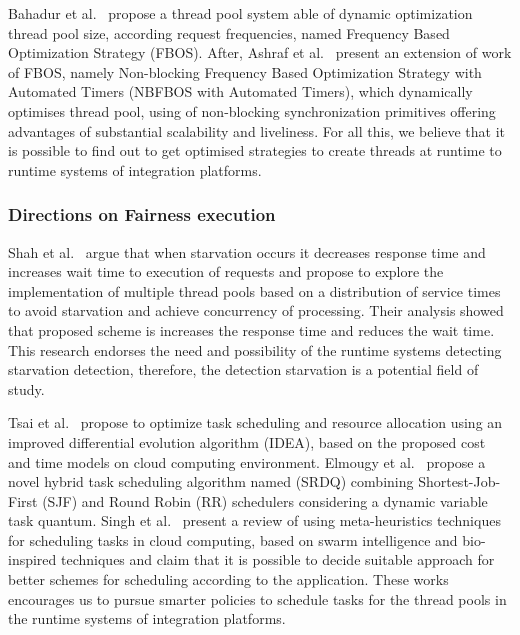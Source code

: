 Bahadur et al.~\cite{bahadur2014} propose a thread pool system able of dynamic optimization thread pool size, according request frequencies, named Frequency Based Optimization Strategy (FBOS). After, Ashraf et al.~\cite{ashraf2016} present an extension of work of FBOS, namely Non-blocking Frequency Based Optimization Strategy with Automated Timers (NBFBOS with Automated Timers), which dynamically optimises thread pool, using of non-blocking synchronization primitives offering advantages of substantial scalability and liveliness. For all this, we believe that it is possible to find out to get optimised strategies to create threads at runtime to runtime systems of integration platforms.

\subsubsection{{Directions on Fairness execution}}
\label{subsubsec:directions_fairness}
Shah et al.~\cite{shah2017} argue that when starvation occurs it decreases response time and increases wait time to execution of requests and propose to explore the implementation of multiple thread pools based on a distribution of service times to avoid starvation and achieve concurrency of processing. Their analysis showed that proposed scheme is increases the response time and reduces the wait time. This research endorses the need and possibility of the runtime systems detecting starvation detection, therefore, the detection starvation is a potential field of study.

Tsai et al.~\cite{tsai2013} propose to optimize task scheduling and resource allocation using an improved differential evolution algorithm (IDEA), based on the proposed cost and time models on cloud computing environment. Elmougy et al.~\cite{elmougy2017} propose a novel hybrid task scheduling algorithm named (SRDQ) combining Shortest-Job-First (SJF) and Round Robin (RR) schedulers considering a dynamic variable task quantum. Singh et al.~\cite{singh2017} present a review of using meta-heuristics techniques for scheduling tasks in cloud computing, based on swarm intelligence and bio-inspired techniques and claim that it is possible to decide suitable approach for better schemes for scheduling according to the application. These works encourages us to pursue smarter policies to schedule tasks for the thread pools in the runtime systems of integration platforms.

